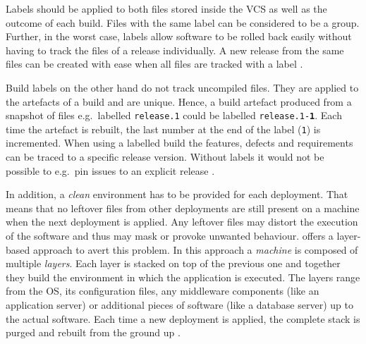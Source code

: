 Labels should be applied to both files stored inside the \ac{VCS} as well as
the outcome of each build. Files with the same label can be considered to be a
group. Further, in the worst case, labels allow software to be rolled back
easily without having to track the files of a release individually. A new
release from the same files can be created with ease when all files are tracked
with a label \autocite[pp. 191-194]{MatyasContinuousIntegration2007}.

Build labels on the other hand do not track uncompiled files. They are applied
to the artefacts of a build and are unique. Hence, a build artefact produced
from a snapshot of files e.g.\ labelled \texttt{release.1}
could be labelled \texttt{release.1-\textbf{1}}. Each time
the artefact is rebuilt, the last number at the end of the label (\texttt{1})
is incremented. When using a labelled build the features, defects and
requirements can be traced to a specific release version. Without
labels it would not be possible to e.g.\ pin issues to an explicit release
\autocite[pp. 195f.]{MatyasContinuousIntegration2007}.

In addition, a \textit{clean} environment has to be provided for each
deployment. That means that no leftover files from other deployments are still
present on a machine when the next deployment is applied. Any leftover files
may distort the execution of the software and thus may mask or provoke unwanted
behaviour. \autocite{ArtacDevOpsIntroducingInfrastructure2017} offers a
layer-based approach to avert this problem. In this approach a \textit{machine}
is composed of multiple \textit{layers}. Each layer is stacked on top of the
previous one and together they build the environment in which the application
is executed. The layers range from the \ac{OS}, its configuration files, any
middleware components (like an application server) or additional pieces of
software (like a database server) up to the actual software. Each time a new
deployment is applied, the complete stack is purged and rebuilt from the ground
up \autocite[p. 194]{MatyasContinuousIntegration2007}.

